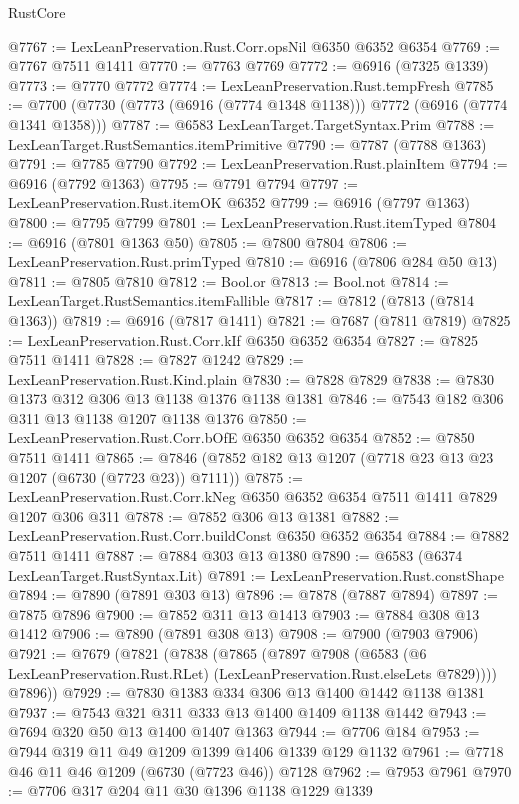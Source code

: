 \begin{lexlean}{RustCore}
\begin{coremodule}
@7767 := LexLeanPreservation.Rust.Corr.opsNil @6350 @6352 @6354
@7769 := @7767 @7511 @1411
@7770 := @7763 @7769
@7772 := @6916 (@7325 @1339)
@7773 := @7770 @7772
@7774 := LexLeanPreservation.Rust.tempFresh
@7785 := @7700 (@7730 (@7773 (@6916 (@7774 @1348 @1138))) @7772 (@6916 (@7774 @1341 @1358)))
@7787 := @6583 LexLeanTarget.TargetSyntax.Prim
@7788 := LexLeanTarget.RustSemantics.itemPrimitive
@7790 := @7787 (@7788 @1363)
@7791 := @7785 @7790
@7792 := LexLeanPreservation.Rust.plainItem
@7794 := @6916 (@7792 @1363)
@7795 := @7791 @7794
@7797 := LexLeanPreservation.Rust.itemOK @6352
@7799 := @6916 (@7797 @1363)
@7800 := @7795 @7799
@7801 := LexLeanPreservation.Rust.itemTyped
@7804 := @6916 (@7801 @1363 @50)
@7805 := @7800 @7804
@7806 := LexLeanPreservation.Rust.primTyped
@7810 := @6916 (@7806 @284 @50 @13)
@7811 := @7805 @7810
@7812 := Bool.or
@7813 := Bool.not
@7814 := LexLeanTarget.RustSemantics.itemFallible
@7817 := @7812 (@7813 (@7814 @1363))
@7819 := @6916 (@7817 @1411)
@7821 := @7687 (@7811 @7819)
@7825 := LexLeanPreservation.Rust.Corr.kIf @6350 @6352 @6354
@7827 := @7825 @7511 @1411
@7828 := @7827 @1242
@7829 := LexLeanPreservation.Rust.Kind.plain
@7830 := @7828 @7829
@7838 := @7830 @1373 @312 @306 @13 @1138 @1376 @1138 @1381
@7846 := @7543 @182 @306 @311 @13 @1138 @1207 @1138 @1376
@7850 := LexLeanPreservation.Rust.Corr.bOfE @6350 @6352 @6354
@7852 := @7850 @7511 @1411
@7865 := @7846 (@7852 @182 @13 @1207 (@7718 @23 @13 @23 @1207 (@6730 (@7723 @23)) @7111))
@7875 := LexLeanPreservation.Rust.Corr.kNeg @6350 @6352 @6354 @7511 @1411 @7829 @1207 @306 @311
@7878 := @7852 @306 @13 @1381
@7882 := LexLeanPreservation.Rust.Corr.buildConst @6350 @6352 @6354
@7884 := @7882 @7511 @1411
@7887 := @7884 @303 @13 @1380
@7890 := @6583 (@6374 LexLeanTarget.RustSyntax.Lit)
@7891 := LexLeanPreservation.Rust.constShape
@7894 := @7890 (@7891 @303 @13)
@7896 := @7878 (@7887 @7894)
@7897 := @7875 @7896
@7900 := @7852 @311 @13 @1413
@7903 := @7884 @308 @13 @1412
@7906 := @7890 (@7891 @308 @13)
@7908 := @7900 (@7903 @7906)
@7921 := @7679
    (@7821
      (@7838
        (@7865
          (@7897
            @7908
            (@6583 (@6 LexLeanPreservation.Rust.RLet) (LexLeanPreservation.Rust.elseLets @7829))))
        @7896))
@7929 := @7830 @1383 @334 @306 @13 @1400 @1442 @1138 @1381
@7937 := @7543 @321 @311 @333 @13 @1400 @1409 @1138 @1442
@7943 := @7694 @320 @50 @13 @1400 @1407 @1363
@7944 := @7706 @184
@7953 := @7944 @319 @11 @49 @1209 @1399 @1406 @1339 @129 @1132
@7961 := @7718 @46 @11 @46 @1209 (@6730 (@7723 @46)) @7128
@7962 := @7953 @7961
@7970 := @7706 @317 @204 @11 @30 @1396 @1138 @1229 @1339

\end{coremodule}
\end{lexlean}
